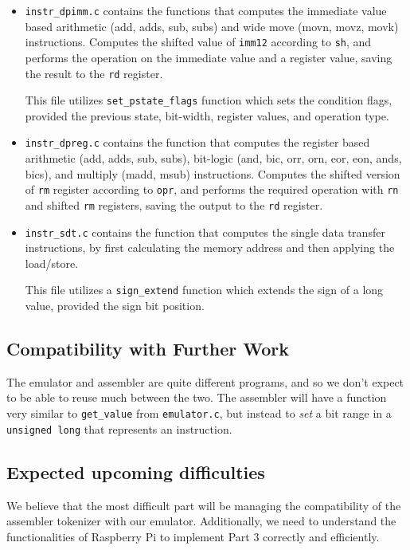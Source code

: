 \documentclass[11pt]{article}
\begin{document}
\begin{itemize}
    \item \verb|instr_dpimm.c| contains the functions that computes the immediate value based arithmetic (add, adds, sub, subs) and wide move (movn, movz, movk) instructions. Computes the shifted value of \verb|imm12| according to \verb|sh|, and performs the operation on the immediate value and a register value, saving the result to the \verb|rd| register.

    This file utilizes \verb|set_pstate_flags| function which sets the condition flags, provided the previous state, bit-width, register values, and operation type.

    \item \verb|instr_dpreg.c| contains the function that computes the register based arithmetic (add, adds, sub, subs), bit-logic (and, bic, orr, orn, eor, eon, ands, bics), and multiply (madd, msub) instructions. Computes the shifted version of \verb|rm| register according to \verb|opr|, and performs the required operation with \verb|rn| and shifted \verb|rm| registers, saving the output to the \verb|rd| register.

    \item \verb|instr_sdt.c| contains the function that computes the single data transfer instructions, by first calculating the memory address and then applying the load/store.
    
    This file utilizes a \verb|sign_extend| function which extends the sign of a long value, provided the sign bit position.

\end{itemize}

\subsection{Compatibility with Further Work}
The emulator and assembler are quite different programs, and so we don't expect to be able to reuse much between the two. The assembler will have a function very similar to \verb|get_value| from \verb|emulator.c|, but instead to \textit{set} a bit range in a \verb|unsigned long| that represents an instruction.

\subsection{Expected upcoming difficulties}
We believe that the most difficult part will be managing the compatibility of the assembler tokenizer with our emulator. Additionally, we need to understand the functionalities of Raspberry Pi to implement Part 3 correctly and efficiently.
\end{document}
